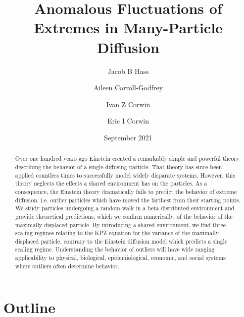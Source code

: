 \documentclass[%
 reprint,
 amsmath,amssymb,
 longbibliography,
 aps,
]{revtex4-1}
\begin{document}
\title{Anomalous Fluctuations of Extremes in Many-Particle Diffusion}
\author{Jacob B Hass}
\author{Aileen Carroll-Godfrey}
\author{Ivan Z Corwin}
\author{Eric I Corwin}
\date{September 2021}

\begin{abstract}
Over one hundred years ago Einstein created a remarkably simple and powerful theory describing the behavior of a single diffusing particle. That theory has since been applied countless times to successfully model widely disparate systems. However, this theory neglects the effects a shared environment has on the particles. As a consequence, the Einstein theory dramatically fails to predict the behavior of extreme diffusion, i.e. outlier particles which have moved the farthest from their starting points. We study particles undergoing a random walk in a beta distributed environment and provide theoretical predictions, which we confirm numerically, of the behavior of the maximally displaced particle. By introducing a shared environment, we find three scaling regimes relating to the KPZ equation for the variance of the maximally displaced particle, contrary to the Einstein diffusion model which predicts a single scaling regime. Understanding the behavior of outliers will have wide ranging applicability to physical, biological, epidemiological, economic, and social systems where outliers often determine behavior.
\end{abstract}

\maketitle

\section{Outline}
\end{document}
